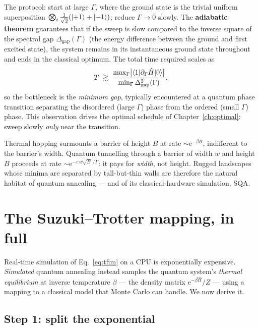 The protocol: start at large $\Gamma$, where the ground state is the trivial
uniform superposition $\bigotimes_i\tfrac{1}{\sqrt2}(\lvert +1\rangle+\lvert -1\rangle)$;
reduce $\Gamma\to0$ slowly. The \textbf{adiabatic theorem} guarantees that if
the sweep is slow compared to the inverse square of the spectral gap
$\Delta_{\mathrm{gap}}(\Gamma)$ (the energy difference between the ground and
first excited state), the system remains in its instantaneous ground state
throughout and ends in the classical optimum. The total time required scales
as
\begin{equation}
T \;\gtrsim\; \frac{\max_\Gamma\bigl|\langle 1\rvert\partial_\Gamma\hat H\lvert 0\rangle\bigr|}{\min_\Gamma \Delta_{\mathrm{gap}}^2(\Gamma)} ,
\label{eq:adiabatic}
\end{equation}
so the bottleneck is the \emph{minimum gap}, typically encountered at a
quantum phase transition separating the disordered (large $\Gamma$) phase
from the ordered (small $\Gamma$) phase. This observation drives the optimal
schedule of Chapter~\ref{ch:optimal}: sweep slowly \emph{only} near the
transition.

\begin{physbox}
Thermal hopping surmounts a barrier of height $B$ at rate
$\sim\mathrm{e}^{-\beta B}$, indifferent to the barrier's width. Quantum
tunnelling through a barrier of width $w$ and height $B$ proceeds at rate
$\sim\mathrm{e}^{-c\,w\sqrt{B}\,/\Gamma}$: it pays for \emph{width}, not
height. Rugged landscapes whose minima are separated by tall-but-thin walls
are therefore the natural habitat of quantum annealing --- and of its
classical-hardware simulation, SQA.
\end{physbox}

\section{The Suzuki--Trotter mapping, in full}
\label{sec:trotter}

Real-time simulation of Eq.~\eqref{eq:tfim} on a CPU is exponentially
expensive. \emph{Simulated} quantum annealing instead samples the quantum
system's \emph{thermal equilibrium} at inverse temperature $\beta$ ---
the density matrix $\mathrm{e}^{-\beta\hat H}/Z$ --- using a mapping to a
classical model that Monte Carlo can handle. We now derive it.

\subsection{Step 1: split the exponential}

